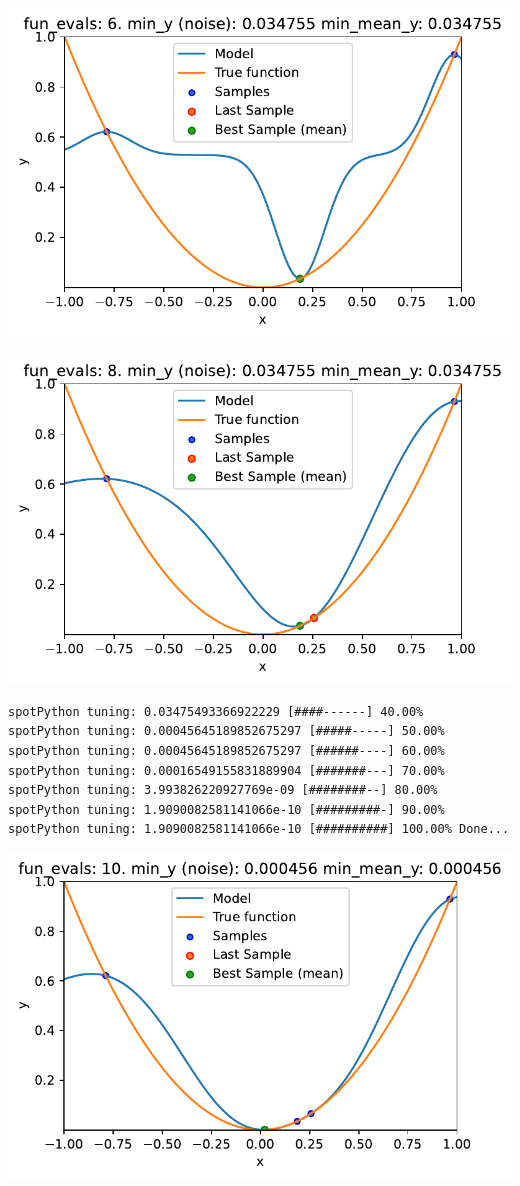 \documentclass[
  letterpaper,
  DIV=11,
  numbers=noendperiod]{scrreprt}
\begin{document}
\includegraphics{014_num_spot_ocba_files/figure-pdf/cell-6-output-1.pdf}

\includegraphics{014_num_spot_ocba_files/figure-pdf/cell-6-output-2.pdf}

\begin{verbatim}
spotPython tuning: 0.03475493366922229 [####------] 40.00% 
spotPython tuning: 0.00045645189852675297 [#####-----] 50.00% 
spotPython tuning: 0.00045645189852675297 [######----] 60.00% 
spotPython tuning: 0.00016549155831889904 [#######---] 70.00% 
spotPython tuning: 3.993826220927769e-09 [########--] 80.00% 
spotPython tuning: 1.9090082581141066e-10 [#########-] 90.00% 
spotPython tuning: 1.9090082581141066e-10 [##########] 100.00% Done...
\end{verbatim}

\includegraphics{014_num_spot_ocba_files/figure-pdf/cell-6-output-4.pdf}
\end{document}
